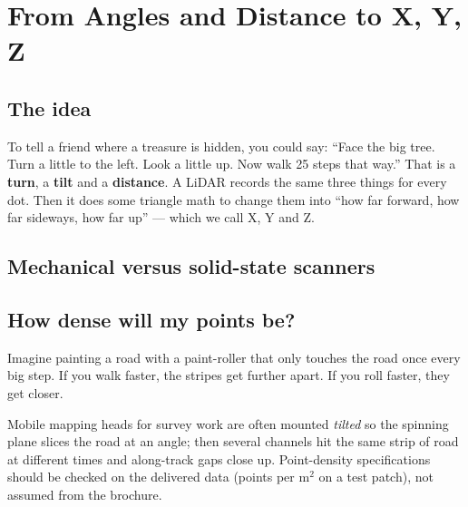 \chapter{From Angles and Distance to X, Y, Z}

\section{The idea}

\begin{kid}
To tell a friend where a treasure is hidden, you could say: ``Face the big tree. Turn a little to the left. Look a little up. Now walk 25 steps that way.'' That is a \textbf{turn}, a \textbf{tilt} and a \textbf{distance}. A LiDAR records the same three things for every dot. Then it does some triangle math to change them into ``how far forward, how far sideways, how far up'' --- which we call X, Y and Z.
\end{kid}



\section{Mechanical versus solid-state scanners}


\section{How dense will my points be?}

\begin{kid}
Imagine painting a road with a paint-roller that only touches the road once every big step. If you walk faster, the stripes get further apart. If you roll faster, they get closer.
\end{kid}


\begin{tip}
Mobile mapping heads for survey work are often mounted \emph{tilted} so the spinning plane slices the road at an angle; then several channels hit the same strip of road at different times and along-track gaps close up. Point-density specifications should be checked on the delivered data (points per m$^2$ on a test patch), not assumed from the brochure.
\end{tip}
